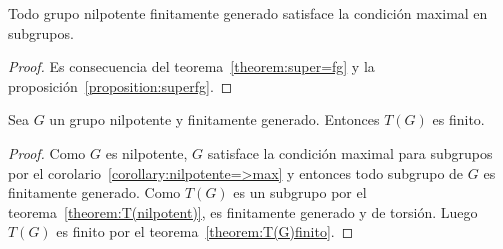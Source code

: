 \begin{corollary}
	\label{corollary:nilpotente=>max}
	Todo grupo nilpotente finitamente generado satisface la condición maximal
	en subgrupos.
\end{corollary}

\begin{proof}
	Es consecuencia del teorema~\ref{theorem:super=fg} y la
	proposición~\ref{proposition:superfg}.
\end{proof}

\begin{theorem}
	Sea $G$ un grupo nilpotente y finitamente generado. Entonces $T(G)$ es
	finito.
\end{theorem}

\begin{proof}
	Como $G$ es nilpotente, $G$ satisface la condición maximal para subgrupos
	por el corolario~\ref{corollary:nilpotente=>max} y entonces
	todo subgrupo de $G$ es finitamente generado. Como $T(G)$ es un subgrupo por el teorema~\ref{theorem:T(nilpotent)}, 
	es finitamente generado y de torsión. Luego $T(G)$ es finito por el
	teorema~\ref{theorem:T(G)finito}.
\end{proof}



